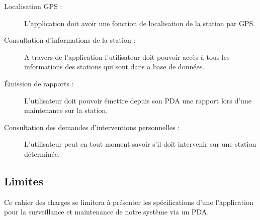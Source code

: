 \begin{description}
\item [Localisation GPS :]
L'application doit avoir une fonction de localisation de la station par GPS.

\item [Consultation d'informations de la station :]
A travers de l'application l'utilisateur doit pouvoir accès à tous les informations des stations 
qui sont dans a base de données.

\item [Émission de rapports :]
L'utilisateur doit pouvoir émettre depuis son PDA une rapport lors d'une maintenance sur la station. 

\item [Consultation des demandes d'interventions personnelles :]
L'utilisateur peut en tout moment savoir s'il doit intervenir sur une station déterminée.

\end{description}

\subsection{Limites}

Ce cahier des charges se limitera à présenter les spécifications d'une l'application
pour la surveillance et maintenance de notre système via un PDA.

